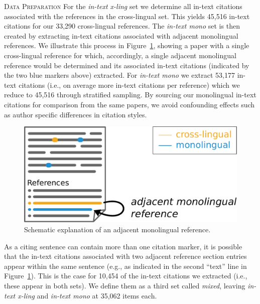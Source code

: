\textsc{Data Preparation}
For the \textit{in-text x-ling} set we determine all in-text citations associated with the references in the cross-lingual set. This yields 45,516 in-text citations for our 33,290 cross-lingual references. The \textit{in-text mono} set is then created by extracting in-text citations associated with adjacent monolingual references. We illustrate this process in Figure~\ref{fig:adjrefsampling}, showing a paper with a single cross-lingual reference for which, accordingly, a single adjacent monolingual reference would be determined and its associated in-text citations (indicated by the two blue markers above) extracted. For \textit{in-text mono} we extract 53,177 in-text citations (i.e., on average more in-text citations per reference) which we reduce to 45,516 through stratified sampling. By sourcing our monolingual in-text citations for comparison from the same papers, we avoid confounding effects such as author specific differences in citation styles.

\begin{figure}[tb]
\centering
\includegraphics[width=0.5\linewidth]{figures/ref_xling/adjacent_reference_sampling.pdf}
\caption{Schematic explanation of an adjacent monolingual reference.} \label{fig:adjrefsampling}
\end{figure}

As a citing sentence can contain more than one citation marker, it is possible that the in-text citations associated with two adjacent reference section entries appear within the same sentence (e.g., as indicated in the second ``text'' line in Figure~\ref{fig:adjrefsampling}). This is the case for 10,454 of the in-text citations we extracted (i.e., these appear in both sets). We define them as a third set called \textit{mixed}, leaving \textit{in-text x-ling} and \textit{in-text mono} at 35,062 items each.

